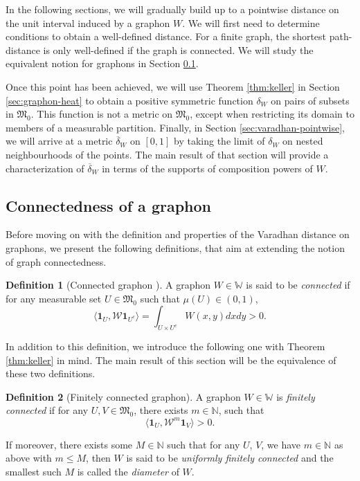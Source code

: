 \documentclass[11pt]{article}
\def\N{\mathbb{N}}
\def\WW{\mathbb{W}}
\def\II{\bm{1}}
\def\calW{\mathcal{W}}
\def\frakM{\mathfrak{M}_0}
\theoremstyle{definition}
\newtheorem{definition}{Definition}[section]
\begin{document}
In the following sections, we will gradually build up to a pointwise distance on the unit interval induced by a graphon $W$. We will first need to determine conditions to obtain a well-defined distance. For a finite graph, the shortest path-distance is only well-defined if the graph is connected. We will study the equivalent notion for graphons in Section \ref{sec:graphon-connectedness}. 

Once this point has been achieved, we will use Theorem \ref{thm:keller} in Section \ref{sec:graphon-heat} to obtain a positive symmetric function $\delta_W$ on pairs of subsets in $\frakM$. This function is not a metric on $\frakM$, except when restricting its domain to members of a measurable partition.  Finally, in Section \ref{sec:varadhan-pointwise}, we will arrive at a metric $\overline{\delta}_W$ on $[0,1]$ by taking the limit of $\delta_W$ on nested neighbourhoods of the points. The main result of that section will provide a characterization of $\overline{\delta}_W$ in terms of the supports of composition powers of $W$.

\subsection{Connectedness of a graphon} \label{sec:graphon-connectedness}

Before moving on with the definition and properties of the Varadhan distance on graph\-ons, we present the following definitions, that aim at extending the notion of graph connectedness.

\begin{definition}[Connected graphon \cite{jansonConnectednessGraphLimits2008}] \label{def:connected-graphon}
A graphon $W \in \WW$ is said to be \textit{connected} if for any measurable set $U \in \mathfrak{M}_0$ such that $\mu(U) \in (0,1)$,
$$ \langle \II_U, \calW \II_{U^c} \rangle = \int_{U \times U^c} W(x,y) dx dy > 0. $$
\end{definition}

In addition to this definition, we introduce the following one with Theorem \ref{thm:keller} in mind. The main result of this section will be the equivalence of these two definitions.

\begin{definition}[Finitely connected graphon] \label{def:finitely-connected-graphon}
    A graphon $W \in \WW$ is \textit{finitely connected} if for any $U,V \in \mathfrak{M}_0$, there exists $m \in \N$, such that
    $$ \langle \II_U, \mathcal{W}^m \II_V \rangle > 0.  $$

    If moreover, there exists some $M \in \N$ such that for any $U$, $V$, we have $m \in \N$ as above with $m \le M$, then $W$ is said to be \textit{uniformly finitely connected} and the smallest such $M$ is called the \textit{diameter} of $W$.
\end{definition}
\end{document}
